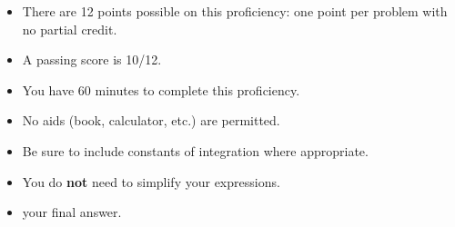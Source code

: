 \documentclass[12pt]{article}
\begin{document}
\begin{itemize}
\item 
There are 12 points possible on this proficiency: one point per problem with
no partial credit. 

\item A passing score is 10/12.

\item You have 60 minutes to complete this proficiency.

\item No aids (book, calculator, etc.) are permitted.  

\item Be sure to include constants of integration where appropriate.

\item You do \textbf{not} need to simplify your expressions.



\item %
 your final answer.

\end{itemize}

\newcommand{\ans}{\ \rule{3in}{.01in}}
\end{document}
